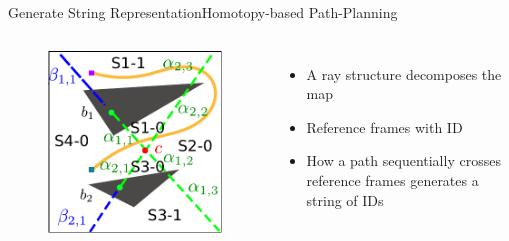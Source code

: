 \begin{frame}{Generate String Representation}{Homotopy-based Path-Planning}

\begin{columns}

\begin{figure}
	\centering
	\includegraphics[width=\linewidth]{figure/obs_map}
\end{figure}
\begin{itemize}
\item A ray structure decomposes the map
\item Reference frames with ID
\item How a path sequentially crosses reference frames generates a string of IDs
\end{itemize}
\end{columns}

\end{frame}

